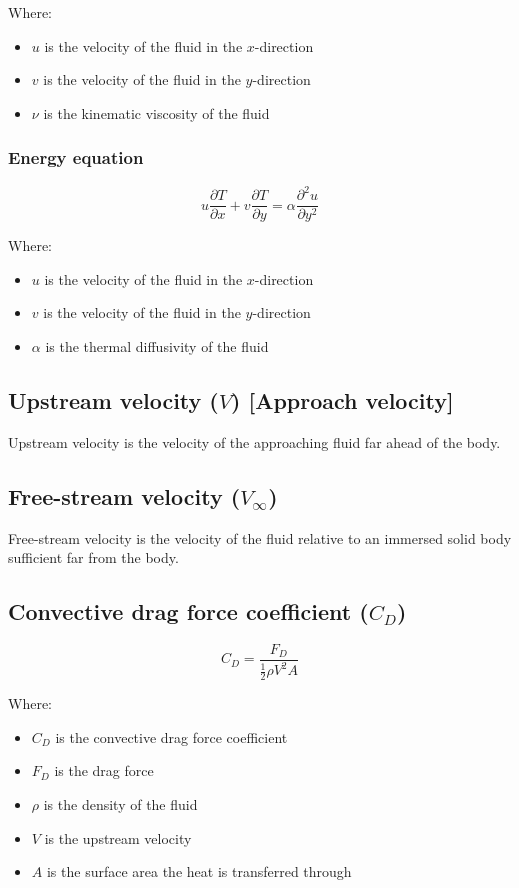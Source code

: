 \documentclass[11pt]{article}
\begin{document}
Where:
\begin{itemize}
\item \(u\) is the velocity of the fluid in the \(x\)-direction
\item \(v\) is the velocity of the fluid in the \(y\)-direction
\item \(\nu\) is the kinematic viscosity of the fluid
\end{itemize}

\subsubsection{Energy equation}
\label{sec:org8c1591b}
\[u \frac{\partial T}{\partial x} + v \frac{\partial T}{\partial y} = \alpha \frac{\partial^2 u}{\partial y^2}\]

Where:
\begin{itemize}
\item \(u\) is the velocity of the fluid in the \(x\)-direction
\item \(v\) is the velocity of the fluid in the \(y\)-direction
\item \(\alpha\) is the thermal diffusivity of the fluid
\end{itemize}

\subsection{Upstream velocity (\(V\)) [Approach velocity]}
\label{sec:org78ea12d}
Upstream velocity is the velocity of the approaching fluid far ahead of the body.

\subsection{Free-stream velocity (\(V_{\infty}\))}
\label{sec:org860c0fe}
Free-stream velocity is the velocity of the fluid relative to an immersed solid body sufficient far from the body.

 \newpage

\subsection{Convective drag force coefficient (\(C_D\))}
\label{sec:org74a97f9}
\[C_D = \frac{F_D}{\frac{1}{2} \rho V^2 A}\]

Where:
\begin{itemize}
\item \(C_D\) is the convective drag force coefficient
\item \(F_D\) is the drag force
\item \(\rho\) is the density of the fluid
\item \(V\) is the upstream velocity
\item \(A\) is the surface area the heat is transferred through
\end{itemize}
\end{document}

